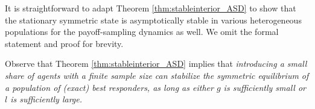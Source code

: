 \documentclass[12pt]{article}
\numberwithin{equation}{section}
\numberwithin{figure}{section}
\theoremstyle{definition}
\theoremstyle{plain}
\theoremstyle{plain}
\theoremstyle{plain}
\theoremstyle{remark}
\theoremstyle{plain}
\theoremstyle{plain}
\begin{document}
It is straightforward to adapt Theorem \ref{thm:stableinterior_ASD} to show that the stationary symmetric state is asymptotically stable in various heterogeneous populations for the payoff-sampling dynamics as well. We omit the formal statement and proof for brevity.

Observe that
Theorem \ref{thm:stableinterior_ASD} implies that \emph{introducing a small share of agents with a finite sample size can stabilize the symmetric equilibrium of a population of (exact) best responders, as long as either $g$ is sufficiently small or $l$ is sufficiently large.}
\end{document}
